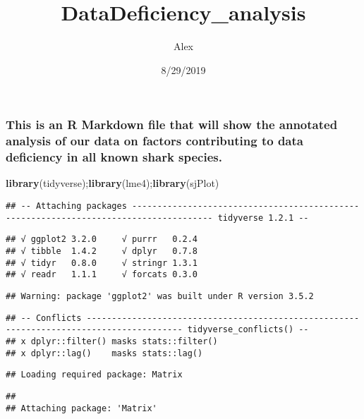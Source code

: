 \documentclass[]{article}
\title{DataDeficiency\_analysis}
\author{Alex}
\date{8/29/2019}
\newenvironment{Shaded}{\begin{snugshade}}{\end{snugshade}}
\newcommand{\KeywordTok}[1]{\textcolor[rgb]{0.13,0.29,0.53}{\textbf{#1}}}
\newcommand{\NormalTok}[1]{#1}
\begin{document}
\maketitle

\subsubsection{This is an R Markdown file that will show the annotated
analysis of our data on factors contributing to data deficiency in all
known shark
species.}\label{this-is-an-r-markdown-file-that-will-show-the-annotated-analysis-of-our-data-on-factors-contributing-to-data-deficiency-in-all-known-shark-species.}

\begin{Shaded}
\begin{Highlighting}[]
\KeywordTok{library}\NormalTok{(tidyverse);}\KeywordTok{library}\NormalTok{(lme4);}\KeywordTok{library}\NormalTok{(sjPlot)}
\end{Highlighting}
\end{Shaded}

\begin{verbatim}
## -- Attaching packages -------------------------------------------------------------------------------------- tidyverse 1.2.1 --
\end{verbatim}

\begin{verbatim}
## √ ggplot2 3.2.0     √ purrr   0.2.4
## √ tibble  1.4.2     √ dplyr   0.7.8
## √ tidyr   0.8.0     √ stringr 1.3.1
## √ readr   1.1.1     √ forcats 0.3.0
\end{verbatim}

\begin{verbatim}
## Warning: package 'ggplot2' was built under R version 3.5.2
\end{verbatim}

\begin{verbatim}
## -- Conflicts ----------------------------------------------------------------------------------------- tidyverse_conflicts() --
## x dplyr::filter() masks stats::filter()
## x dplyr::lag()    masks stats::lag()
\end{verbatim}

\begin{verbatim}
## Loading required package: Matrix
\end{verbatim}

\begin{verbatim}
## 
## Attaching package: 'Matrix'
\end{verbatim}
\end{document}
